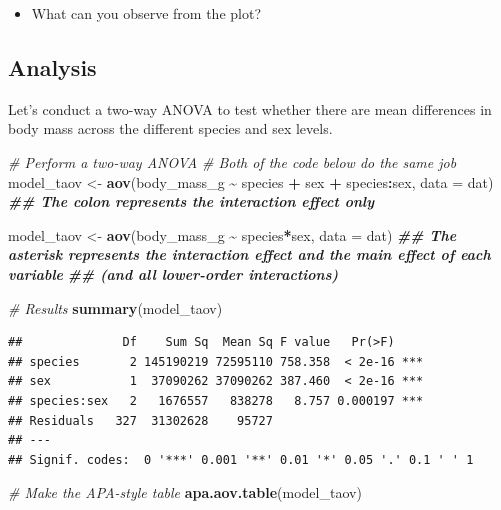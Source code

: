 \documentclass[
]{book}
\newenvironment{Shaded}{\begin{snugshade}}{\end{snugshade}}
\newcommand{\AttributeTok}[1]{\textcolor[rgb]{0.13,0.29,0.53}{#1}}
\newcommand{\CommentTok}[1]{\textcolor[rgb]{0.56,0.35,0.01}{\textit{#1}}}
\newcommand{\DocumentationTok}[1]{\textcolor[rgb]{0.56,0.35,0.01}{\textbf{\textit{#1}}}}
\newcommand{\FunctionTok}[1]{\textcolor[rgb]{0.13,0.29,0.53}{\textbf{#1}}}
\newcommand{\NormalTok}[1]{#1}
\newcommand{\OtherTok}[1]{\textcolor[rgb]{0.56,0.35,0.01}{#1}}
\newcommand{\SpecialCharTok}[1]{\textcolor[rgb]{0.81,0.36,0.00}{\textbf{#1}}}
\providecommand{\tightlist}{%
  \setlength{\itemsep}{0pt}\setlength{\parskip}{0pt}}
\begin{document}
\begin{itemize}
\tightlist
\item
  What can you observe from the plot?
\end{itemize}

\subsection{Analysis}\label{analysis-1}

Let's conduct a two-way ANOVA to test whether there are mean differences in body mass across the different species and sex levels.

\begin{Shaded}
\begin{Highlighting}[]
\CommentTok{\# Perform a two{-}way ANOVA}
\CommentTok{\# Both of the code below do the same job}
\NormalTok{model\_taov }\OtherTok{\textless{}{-}} \FunctionTok{aov}\NormalTok{(body\_mass\_g }\SpecialCharTok{\textasciitilde{}}\NormalTok{ species }\SpecialCharTok{+}\NormalTok{ sex }\SpecialCharTok{+}\NormalTok{ species}\SpecialCharTok{:}\NormalTok{sex, }\AttributeTok{data =}\NormalTok{ dat)}
\DocumentationTok{\#\# The colon represents the interaction effect only}

\NormalTok{model\_taov }\OtherTok{\textless{}{-}} \FunctionTok{aov}\NormalTok{(body\_mass\_g }\SpecialCharTok{\textasciitilde{}}\NormalTok{ species}\SpecialCharTok{*}\NormalTok{sex, }\AttributeTok{data =}\NormalTok{ dat)}
\DocumentationTok{\#\# The asterisk represents the interaction effect and the main effect of each variable}
\DocumentationTok{\#\# (and all lower{-}order interactions)}

\CommentTok{\# Results}
\FunctionTok{summary}\NormalTok{(model\_taov)}
\end{Highlighting}
\end{Shaded}

\begin{verbatim}
##              Df    Sum Sq  Mean Sq F value   Pr(>F)    
## species       2 145190219 72595110 758.358  < 2e-16 ***
## sex           1  37090262 37090262 387.460  < 2e-16 ***
## species:sex   2   1676557   838278   8.757 0.000197 ***
## Residuals   327  31302628    95727                     
## ---
## Signif. codes:  0 '***' 0.001 '**' 0.01 '*' 0.05 '.' 0.1 ' ' 1
\end{verbatim}

\begin{Shaded}
\begin{Highlighting}[]
\CommentTok{\# Make the APA{-}style table}
\FunctionTok{apa.aov.table}\NormalTok{(model\_taov)}
\end{Highlighting}
\end{Shaded}
\end{document}
